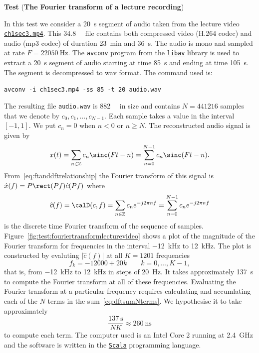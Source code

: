 \documentclass[11pt,a4paper]{book}
\theoremstyle{plain}
\numberwithin{equation}{section}
\newcommand{\ints}{{\mathbb Z}}
\newcommand{\abs}[1]{\left\vert #1 \right\vert}
\newcounter{test}
\newenvironment{test}{
\begin{shaded}\refstepcounter{test}\par\noindent%
\textbf{Test \thetest}
}{
\end{shaded}
}
\begin{document}
\begin{test}\label{test:ftlecturerec}
(\textbf{The Fourier transform of a lecture recording})

In this test we consider a \SI{20}{\second} segment of audio taken from the lecture video \href{www.itr.unisa.edu.au/~mckillrg/videos/lectures/signalsandsystems2014/ch1sec3.mp4}{\texttt{ch1sec3.mp4}}.  
This \SI{34.8}{\mega\byte} file contains both compressed video (H.264 codec) and audio (mp3 codec) of duration \SI{23}{\minute} and \SI{36}{\second}.  The audio is mono and sampled at rate $F = \SI{22050}{\hertz}$.  The \texttt{avconv} program from the \href{https://libav.org}{\texttt{libav}} library is used to extract a \SI{20}{\second} segment of audio starting at time \SI{85}{\second} and ending at time \SI{105}{\second}.  The segment is decompressed to wav format.  The command used is:
\begin{center}
\parbox[][][c]{10cm}{
\texttt{avconv -i ch1sec3.mp4 -ss 85 -t 20 audio.wav}
}
\end{center}
The resulting file \texttt{audio.wav} is \SI{882}{\kilo\byte} in size and contains $N = 441216$ samples that we denote by $c_0,c_1,\dots,c_{N-1}$.  Each sample takes a value in the interval $[-1,1]$.  We put $c_n = 0$ when $n < 0$ or $n \geq N$.  The reconstructed audio signal is given by
\[
x(t) = \sum_{n \in \ints} c_n \sinc(Ft - n) = \sum_{n=0}^{N-1} c_n \sinc(Ft - n).
\]
From~\eqref{eq:ftanddftrelationship} the Fourier transform of this signal is $\hat{x}(f) = P \rect(P f) \hat{c}(Pf)$ where 
\begin{equation}\label{eq:dftsumNterms}
\hat{c}(f) = \calD(c,f) = \sum_{n \in \ints} c_n e^{-j 2\pi n f}  = \sum_{n = 0}^{N-1} c_n e^{-j 2\pi n f}
\end{equation}
is the discrete time Fourier transform of the sequence of samples.  Figure~\ref{fig:test:fouriertransformlecturevideo} shows a plot of the magnitude of the Fourier transform for frequencies in the interval \SI{-12}{\kilo\hertz} to \SI{12}{\kilo\hertz}.  The plot is constructed by evaluting $\abs{\hat{c}(f)}$ at all $K = 1201$ frequencies
\[
f_k = -12000 + 20k \qquad k = 0, \dots, K-1,
\]
that is, from \SI{-12}{\kilo\hertz} to \SI{12}{\kilo\hertz} in steps of \SI{20}{\hertz}.  It takes approximately \SI{137}{\second} to compute the Fourier transform at all of these frequencies.  Evaluating the Fourier transform at a particular frequency requires calculating and accumlating each of the $N$ terms in the sum~\eqref{eq:dftsumNterms}.  We hypothesise it to take approximately
\[
\frac{\SI{137}{\second}}{NK} \approx \SI{260}{\nano\second}
\]
to compute each term.   The computer used is an Intel Core 2 running at \SI{2.4}{\giga\hertz} and the software is written in the \href{http://scala-lang.org/}{\texttt{Scala}} programming language.


\end{test}
\end{document}
